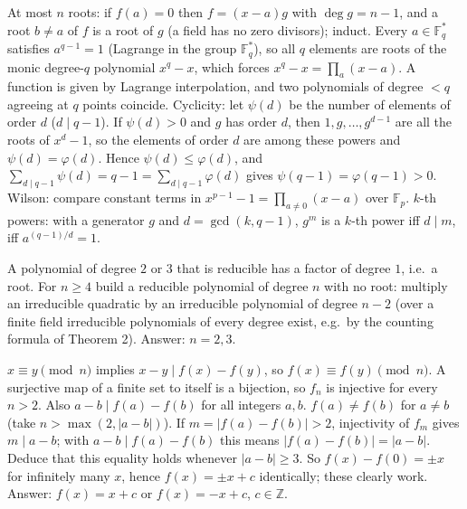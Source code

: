 \documentclass[11pt,a4paper]{article}
\begin{document}

 At most $n$ roots: if $f(a)=0$ then $f=(x-a)g$ with $\deg g=n-1$, and a root $b\ne a$ of $f$ is a root of $g$ (a field has no zero divisors); induct. Every $a\in\mathbb{F}_q^*$ satisfies $a^{q-1}=1$ (Lagrange in the group $\mathbb{F}_q^*$), so all $q$ elements are roots of the monic degree-$q$ polynomial $x^q-x$, which forces $x^q-x=\prod_a(x-a)$. A function is given by Lagrange interpolation, and two polynomials of degree $<q$ agreeing at $q$ points coincide.
 Cyclicity: let $\psi(d)$ be the number of elements of order $d$ ($d\mid q-1$). If $\psi(d)>0$ and $g$ has order $d$, then $1,g,\dots,g^{d-1}$ are all the roots of $x^d-1$, so the elements of order $d$ are among these powers and $\psi(d)=\varphi(d)$. Hence $\psi(d)\le\varphi(d)$, and $\sum_{d\mid q-1}\psi(d)=q-1=\sum_{d\mid q-1}\varphi(d)$ gives $\psi(q-1)=\varphi(q-1)>0$.
 Wilson: compare constant terms in $x^{p-1}-1=\prod_{a\ne0}(x-a)$ over $\mathbb{F}_p$. $k$-th powers: with a generator $g$ and $d=\gcd(k,q-1)$, $g^m$ is a $k$-th power iff $d\mid m$, iff $a^{(q-1)/d}=1$.

 A polynomial of degree $2$ or $3$ that is reducible has a factor of degree $1$, i.e.\ a root.
 For $n\ge4$ build a reducible polynomial of degree $n$ with no root: multiply an irreducible quadratic by an irreducible polynomial of degree $n-2$ (over a finite field irreducible polynomials of every degree exist, e.g.\ by the counting formula of Theorem 2). Answer: $n=2,3$.

 $x\equiv y\pmod n$ implies $x-y\mid f(x)-f(y)$, so $f(x)\equiv f(y)\pmod n$.
 A surjective map of a finite set to itself is a bijection, so $f_n$ is injective for every $n>2$. Also $a-b\mid f(a)-f(b)$ for all integers $a,b$.
 $f(a)\ne f(b)$ for $a\ne b$ (take $n>\max(2,|a-b|)$). If $m=|f(a)-f(b)|>2$, injectivity of $f_m$ gives $m\mid a-b$; with $a-b\mid f(a)-f(b)$ this means $|f(a)-f(b)|=|a-b|$. Deduce that this equality holds whenever $|a-b|\ge3$.
 So $f(x)-f(0)=\pm x$ for infinitely many $x$, hence $f(x)=\pm x+c$ identically; these clearly work. Answer: $f(x)=x+c$ or $f(x)=-x+c$, $c\in\mathbb{Z}$.
\end{document}
